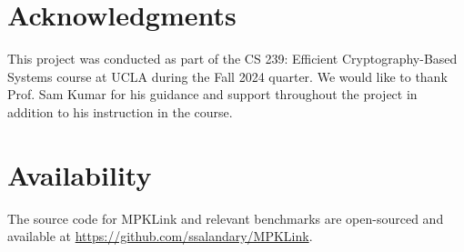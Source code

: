 \documentclass[letterpaper,twocolumn,10pt]{article}
\begin{document}
\section*{Acknowledgments}
This project was conducted as part of the CS 239: Efficient Cryptography-Based Systems course at UCLA during the Fall 2024 quarter.
We would like to thank Prof.
Sam Kumar for his guidance and support throughout the project in addition to his instruction in the course.

\section*{Availability}
The source code for MPKLink and relevant benchmarks are open-sourced and available at \url{https://github.com/ssalandary/MPKLink}.




\end{document}
